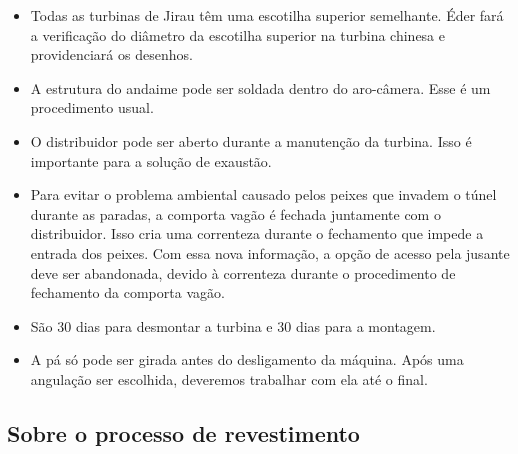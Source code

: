 \documentclass[12pt,a4paper]{article}
\begin{document}
\begin{itemize}
  \item Todas as turbinas de Jirau têm uma escotilha superior semelhante. Éder
  fará a verificação do diâmetro da escotilha superior na turbina chinesa e providenciará os desenhos.

  \item A estrutura do andaime pode ser soldada dentro do aro-câmera. Esse é um procedimento usual.
  
  \item O distribuidor pode ser aberto durante a manutenção da turbina. Isso é
  importante para a solução de exaustão.
  
  \item Para evitar o problema ambiental causado pelos peixes que invadem o
  túnel durante as paradas, a comporta vagão é fechada juntamente com o
  distribuidor. Isso cria uma correnteza durante o fechamento que impede a
  entrada dos peixes. Com essa nova informação, a opção de acesso pela
  jusante deve ser abandonada, devido à correnteza durante o procedimento de
  fechamento da comporta vagão.
  
  \item São 30 dias para desmontar a turbina e 30 dias para a montagem.
  
  \item A pá só pode ser girada antes do desligamento da máquina. Após uma
  angulação ser escolhida, deveremos trabalhar com ela até o final.

\end{itemize}

\subsection{Sobre o processo de revestimento}
\end{document}
